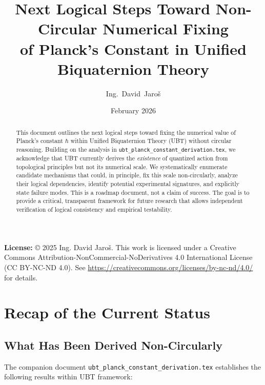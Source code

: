 \documentclass[12pt]{article}
\title{Next Logical Steps Toward Non-Circular Numerical Fixing\\of Planck's Constant in Unified Biquaternion Theory}
\author{Ing.~David~Jaroš}
\date{February 2026}
\begin{document}
\maketitle

\noindent
\textbf{License:} © 2025 Ing. David Jaroš. This work is licensed under a Creative Commons Attribution-NonCommercial-NoDerivatives 4.0 International License (CC BY-NC-ND 4.0). See \url{https://creativecommons.org/licenses/by-nc-nd/4.0/} for details.

\vspace{1em}

\begin{abstract}
This document outlines the next logical steps toward fixing the numerical value of Planck's constant $\hbar$ within Unified Biquaternion Theory (UBT) without circular reasoning. Building on the analysis in \texttt{ubt\_planck\_constant\_derivation.tex}, we acknowledge that UBT currently derives the \emph{existence} of quantized action from topological principles but not its numerical scale. We systematically enumerate candidate mechanisms that could, in principle, fix this scale non-circularly, analyze their logical dependencies, identify potential experimental signatures, and explicitly state failure modes. This is a roadmap document, not a claim of success. The goal is to provide a critical, transparent framework for future research that allows independent verification of logical consistency and empirical testability.
\end{abstract}

\tableofcontents
\newpage

\section{Recap of the Current Status}

\subsection{What Has Been Derived Non-Circularly}

The companion document \texttt{ubt\_planck\_constant\_derivation.tex} establishes the following results within UBT framework:
\end{document}
